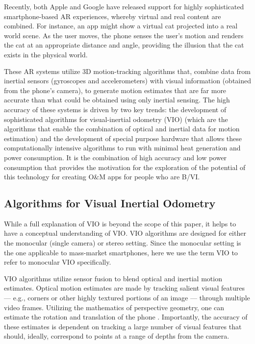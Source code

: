 \documentclass[chi_draft]{sigchi}
\newcommand{\BVI}{B/VI\xspace}
\newcommand{\OM}{O\&M\xspace}
\begin{document}
Recently, both Apple and Google have released support for highly sophisticated smartphone-based AR experiences, whereby virtual and real content are combined.  For instance, an app might show a virtual cat projected into a real world scene.  As the user moves, the phone senses the user's motion and renders the cat at an appropriate distance and angle, providing the illusion that the cat exists in the physical world.

These AR systems utilize 3D motion-tracking algorithms that, combine data from inertial sensors (gyroscopes and accelerometers) with visual information (obtained from the phone's camera), to generate motion estimates that are far more accurate than what could be obtained using only inertial sensing.  The high accuracy of these systems is driven by two key trends: the development of sophisticated algorithms for visual-inertial odometry (VIO) \cite{li2013high,leutenegger2015keyframe,bloesch2015robust,forster2014svo} (which are the algorithms that enable the combination of optical and inertial data for motion estimation) and the development of special purpose hardware that allows these computationally intensive algorithms to run with minimal heat generation and power consumption.  It is the combination of high accuracy and low power consumption that provides the motivation for the exploration of the potential of this technology for creating \OM apps for people who are \BVI.

\subsection{Algorithms for Visual Inertial Odometry}
While a full explanation of VIO \cite{gui2015review} is beyond the scope of this paper, it helps to have a conceptual understanding of VIO.  VIO algorithms are designed for either the monocular (single camera) or stereo setting.  Since the monocular setting is the one applicable to mass-market smartphones, here we use the term VIO to refer to monocular VIO specifically.

VIO algorithms utilize sensor fusion to blend optical and inertial motion estimates.  Optical motion estimates are made by tracking salient visual features --- e.g., corners or other highly textured portions of an image --- through multiple video frames.  Utilizing the mathematics of perspective geometry, one can estimate the rotation and translation of the phone \cite{Hartley2004}.  Importantly, the accuracy of these estimates is dependent on tracking a large number of visual features that should, ideally, correspond to points at a range of depths from the camera.%
\end{document}
